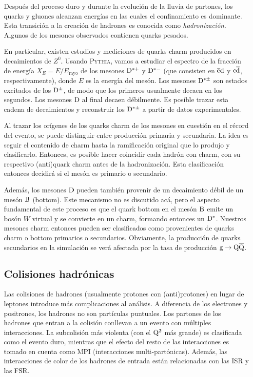 \documentclass[a4paper,12pt]{article}
\begin{document}
Después del proceso duro y durante la evolución de la lluvia de partones, los quarks y gluones alcanzan energías en las cuales el confinamiento es dominante. Esta transición a la creación de hadrones es conocida como \textit{hadronización}. Algunos de los mesones observados contienen quarks pesados.

En particular, existen estudios y mediciones de quarks charm producidos en decaimientos de $Z^0$\cite{Barate:1999bg}. Usando \textsc{Pythia}, vamos a estudiar el espectro de la fracción de energía $X_E=E/E_{\mbox{rayo}}$ de los mesones ${\mathrm D}^{*+}$ y ${\mathrm D}^{*-}$ (que consisten en $\overline{\mathrm c}{\mathrm d}$ y ${\mathrm c}\overline{\mathrm d}$, respectivamente), donde $E$ es la energía del mesón. Los mesones ${\mathrm D}^{*\pm}$ son estados excitados de los ${\mathrm D}^{\pm}$, de modo que los primeros usualmente decaen en los segundos. Los mesones ${\mathrm D}$ al final decaen débilmente. Es posible trazar esta cadena de decaimientos y reconstruir los ${\mathrm D}^{*\pm}$ a partir de datos experimentales.

Al trazar los orígenes de los quarks charm de los mesones en cuestión en el récord del evento, se puede distinguir entre producción primaria y secundaria. La idea es seguir el contenido de charm hasta la ramificación original que lo produjo y clasificarlo. Entonces, es posible hacer coincidir cada hadrón con charm, con su respectivo (anti)quark charm antes de la hadronización. Esta clasificación entonces decidirá si el mesón es primario o secundario.

Además, los mesones ${\mathrm D}$ pueden también provenir de un decaimiento débil de un mesón ${\mathrm B}$ (bottom). Este mecanismo no es discutido acá, pero el aspecto fundamental de este proceso es que el quark bottom en el mesón ${\mathrm B}$ emite un bosón $W$ virtual y se convierte en un charm, formando entonces un ${\mathrm D}^*$. Nuestros mesones charm entonces pueden ser clasificados como provenientes de quarks charm o bottom primarios o secundarios. Obviamente, la producción de quarks secundarios en la simulación se verá afectada por la tasa de producción ${\mathrm g}\to{\mathrm Q}\overline{\mathrm Q}$.

\subsection{Colisiones hadrónicas}

Las colisiones de hadrones (usualmente protones con (anti)protones) en lugar de leptones introduce más complicaciones al análisis. A diferencia de los electrones y positrones, los hadrones no son partículas puntuales. Los partones de los hadrones que entran a la colisión conllevan a un evento con múltiples interacciones. La subcolisión más violenta (con el ${\mathrm Q}^2$ más grande) es clasificada como el evento duro, mientras que el efecto del resto de las interacciones es tomado en cuenta como MPI (interacciones multi-partónicas). Además, las interacciones de color de los hadrones de entrada están relacionadas con las ISR y las FSR. 
\end{document}
